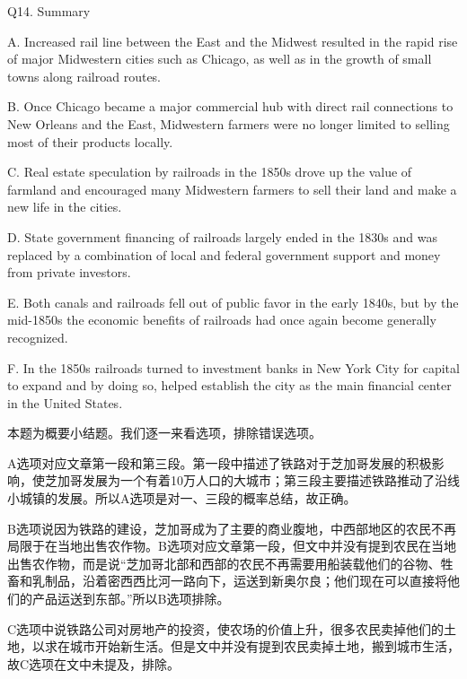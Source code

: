 \begin{blk}
    \begin{qst}
        Q14. Summary
    \end{qst}

    \begin{chc}
        A. Increased rail line between the East and the Midwest resulted in the rapid rise of major Midwestern cities such as Chicago, as well as in the growth of small towns along railroad routes.

        B. Once Chicago became a major commercial hub with direct rail connections to New Orleans and the East, Midwestern farmers were no longer limited to selling most of their products locally.

        C. Real estate speculation by railroads in the 1850s drove up the value of farmland and encouraged many Midwestern farmers to sell their land and make a new life in the cities.

        D. State government financing of railroads largely ended in the 1830s and was replaced by a combination of local and federal government support and money from private investors.

        E. Both canals and railroads fell out of public favor in the early 1840s, but by the mid-1850s the economic benefits of railroads had once again become generally recognized.

        F. In the 1850s railroads turned to investment banks in New York City for capital to expand and by doing so, helped establish the city as the main financial center in the United States.
    \end{chc}

    \begin{nlz}
        本题为概要小结题。我们逐一来看选项，排除错误选项。

        A选项对应文章第一段和第三段。第一段中描述了铁路对于芝加哥发展的积极影响，使芝加哥发展为一个有着10万人口的大城市；第三段主要描述铁路推动了沿线小城镇的发展。所以A选项是对一、三段的概率总结，故正确。

        B选项说因为铁路的建设，芝加哥成为了主要的商业腹地，中西部地区的农民不再局限于在当地出售农作物。B选项对应文章第一段，但文中并没有提到农民在当地出售农作物，而是说“芝加哥北部和西部的农民不再需要用船装载他们的谷物、牲畜和乳制品，沿着密西西比河一路向下，运送到新奥尔良；他们现在可以直接将他们的产品运送到东部。”所以B选项排除。

        C选项中说铁路公司对房地产的投资，使农场的价值上升，很多农民卖掉他们的土地，以求在城市开始新生活。但是文中并没有提到农民卖掉土地，搬到城市生活，故C选项在文中未提及，排除。


\end{nlz}
\end{blk}
